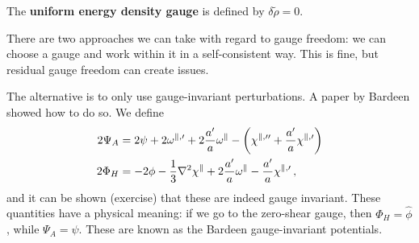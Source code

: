 \documentclass[main.tex]{subfiles}
\begin{document}
The \textbf{uniform energy density gauge} is defined by \(\delta \widetilde{\rho} = 0\). 

There are two approaches we can take with regard to gauge freedom: we can choose a gauge and work within it in a self-consistent way. 
This is fine, but residual gauge freedom can create issues. 

The alternative is to only use gauge-invariant perturbations. 
A paper by Bardeen \cite[]{bardeenGaugeinvariantCosmologicalPerturbations1980a} showed how to do so.
We define 
%
\begin{align}
2 \Psi  _A &= 2 \psi + 2 \omega^{\parallel, \prime} + 2 \frac{a'}{a} \omega^{\parallel} - \qty(\chi^{\parallel, \prime \prime} + \frac{a'}{a} \chi^{\parallel, \prime})  \\
2 \Phi_H &= -2 \phi - \frac{1}{3} \nabla^2 \chi^{\parallel} + 2 \frac{a'}{a} \omega^{\parallel} - \frac{a'}{a} \chi^{\parallel, \prime}
\,,
\end{align}
%
and it can be shown (exercise) that these are indeed gauge invariant. 
These quantities have a physical meaning: if we go to the zero-shear gauge, then \(\Phi _H = \hat{\phi} \), while \(\Psi _A = \psi \).
These are known as the Bardeen gauge-invariant potentials. 
\end{document}
